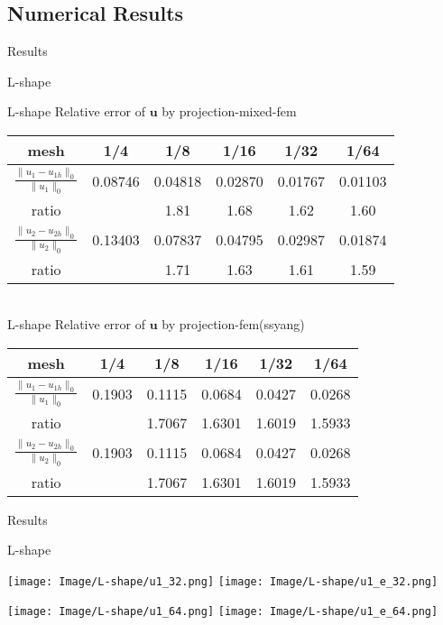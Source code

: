 \documentclass[13pt]{beamer}
\begin{document}
\subsection{Numerical Results}
\begin{frame}[shrink=10]{Results}
   \begin{block}{L-shape}
   \begin{center}

   {\color{red} L-shape Relative error of $\mathbf{u}$ by projection-mixed-fem}\\[2ex]
   \begin{tabular}{cccccc}
     \hline
     mesh & 1/4 & 1/8 & 1/16 & 1/32 & 1/64 \\
     \hline
     $\frac{\|u_1 - u_{1h}\|_0}{\|u_1\|_0}$ & 0.08746 & 0.04818 & 0.02870 & 0.01767 & 0.01103 \\
     ratio &  & 1.81 & 1.68 & 1.62 & 1.60  \\
     $\frac{\|u_2 - u_{2h}\|_0}{\|u_2\|_0}$ & 0.13403 & 0.07837 & 0.04795 & 0.02987 & 0.01874 \\
     ratio &  & 1.71 & 1.63 & 1.61 & 1.59  \\
     \hline
   \end{tabular}\\[2ex]
   {\color{red} L-shape Relative error of $\mathbf{u}$ by projection-fem(ssyang)}\\[2ex]
      \begin{tabular}{cccccc}
     \hline
     mesh & 1/4 & 1/8 & 1/16 & 1/32 & 1/64 \\
     \hline
     $\frac{\|u_1 - u_{1h}\|_0}{\|u_1\|_0}$ &0.1903& 0.1115& 0.0684 &0.0427 &0.0268 \\
     ratio &  &1.7067  &1.6301  &1.6019  &1.5933   \\
     $\frac{\|u_2 - u_{2h}\|_0}{\|u_2\|_0}$ &0.1903& 0.1115& 0.0684 &0.0427 &0.0268 \\
     ratio &  &1.7067  &1.6301  &1.6019  &1.5933  \\
     \hline
   \end{tabular}
   \end{center}
   \end{block}
\end{frame}

\begin{frame}[shrink=5]{Results}
  \begin{block}{L-shape}
   \begin{center}
     \texttt{[image: Image/L-shape/u1\_32.png]}
     \texttt{[image: Image/L-shape/u1\_e\_32.png]}
   \end{center}
   \begin{center}
     \texttt{[image: Image/L-shape/u1\_64.png]}
     \texttt{[image: Image/L-shape/u1\_e\_64.png]}
   \end{center}
  \end{block}
\end{frame}
\end{document}
